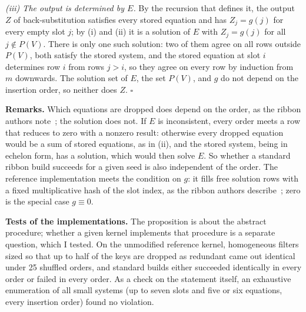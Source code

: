 \documentclass{article}
\begin{document}
\emph{(iii) The output is determined by $E$.} By the recursion that defines it, the output $Z$ of
back-substitution satisfies every stored equation and has $Z_j=g(j)$ for every empty slot $j$; by
(i) and (ii) it is a solution of $E$ with $Z_j=g(j)$ for all $j\notin P(V)$. There is only one
such solution: two of them agree on all rows outside $P(V)$, both satisfy the stored system, and
the stored equation at slot $i$ determines row $i$ from rows $j>i$, so they agree on every row by
induction from $m$ downwards. The solution set of $E$, the set $P(V)$, and $g$ do not depend on
the insertion order, so neither does $Z$. \hfill$\square$

\textbf{Remarks.} Which equations are dropped does depend on the order, as the ribbon authors
note~\citep{dietzfelbinger2026ribbon}; the solution does not. If $E$ is inconsistent, every order
meets a row that reduces to zero with a nonzero result: otherwise every dropped equation would be
a sum of stored equations, as in (ii), and the stored system, being in echelon form, has a
solution, which would then solve $E$. So whether a standard ribbon build succeeds for a given seed
is also independent of the order. The reference implementation meets the condition on $g$: it
fills free solution rows with a fixed multiplicative hash of the slot index, as the ribbon authors
describe~\citep{dietzfelbinger2026ribbon}; zero is the special case $g\equiv 0$.

\textbf{Tests of the implementations.} The proposition is about the abstract procedure; whether a
given kernel implements that procedure is a separate question, which I tested. On the unmodified
reference kernel, homogeneous filters sized so that up to half of the keys are dropped as
redundant came out identical under 25 shuffled orders, and standard builds either succeeded
identically in every order or failed in every order. As a check on the statement itself, an
exhaustive enumeration of all small systems (up to seven slots and five or six equations, every
insertion order) found no violation.
\end{document}
